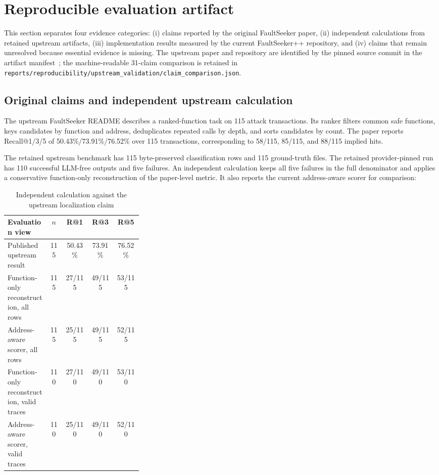 \documentclass[conference]{IEEEtran}
\begin{document}
\section{Reproducible evaluation artifact}

This section separates four evidence categories: (i) claims reported by the
original FaultSeeker paper, (ii) independent calculations from retained upstream
artifacts, (iii) implementation results measured by the current FaultSeeker++
repository, and (iv) claims that remain unresolved because essential evidence is
missing. The upstream paper and repository are identified by the pinned source
commit in the artifact manifest~\cite{faultseeker_upstream}; the machine-readable
31-claim comparison is retained in
\texttt{reports/reproducibility/upstream\_validation/claim\_comparison.json}.

\subsection{Original claims and independent upstream calculation}

The upstream FaultSeeker README describes a ranked-function task on 115 attack
transactions. Its ranker filters common safe functions, keys candidates by
function and address, deduplicates repeated calls by depth, and sorts candidates
by count. The paper reports Recall@1/3/5 of 50.43\%/73.91\%/76.52\% over 115
transactions, corresponding to 58/115, 85/115, and 88/115 implied hits.

The retained upstream benchmark has 115 byte-preserved classification rows and
115 ground-truth files. The retained provider-pinned run has 110 successful
LLM-free outputs and five failures. An independent calculation keeps all five
failures in the full denominator and applies a conservative function-only
reconstruction of the paper-level metric. It also reports the current
address-aware scorer for comparison:

\begin{table}[t]
\caption{Independent calculation against the upstream localization claim}
\label{tab:upstream_localization}
\centering
\small
\begin{tabular}{p{0.31\linewidth}c c c c}
\toprule
Evaluation view & $n$ & R@1 & R@3 & R@5\\
\midrule
Published upstream result & 115 & 50.43\% & 73.91\% & 76.52\%\\
Function-only reconstruction, all rows & 115 & 27/115 & 49/115 & 53/115\\
Address-aware scorer, all rows & 115 & 25/115 & 49/115 & 52/115\\
Function-only reconstruction, valid traces & 110 & 27/110 & 49/110 & 53/110\\
Address-aware scorer, valid traces & 110 & 25/110 & 49/110 & 52/110\\
\bottomrule
\end{tabular}
\end{table}
\end{document}
